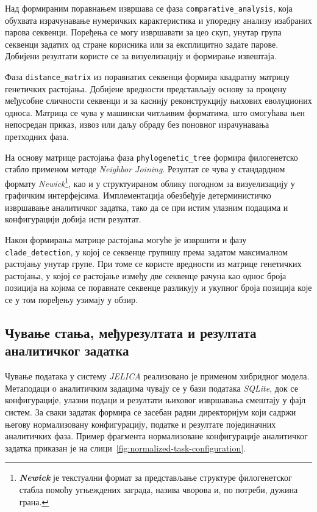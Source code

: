 \documentclass[12pt,oneside]{memoir}
\begin{document}
Над формираним поравнањем извршава се фаза \texttt{comparative\_analysis}, која обухвата израчунавање нумеричких карактеристика и упоредну анализу изабраних парова секвенци. Поређења се могу извршавати за цео скуп, унутар група секвенци задатих од стране корисника или за експлицитно задате парове. Добијени резултати користе се за визуелизацију и формирање извештаја.

Фаза \texttt{distance\_matrix} из поравнатих секвенци формира квадратну матрицу генетичких растојања. Добијене вредности представљају основу за процену међусобне сличности секвенци и за каснију реконструкцију њихових еволуционих односа. Матрица се чува у машински читљивим форматима, што омогућава њен непосредан приказ, извоз или даљу обраду без поновног израчунавања претходних фаза.

На основу матрице растојања фаза \texttt{phylogenetic\_tree} формира филогенетско стабло применом методе \textit{Neighbor Joining}. Резултат се чува у стандардном формату \textit{Newick}\footnote{\textit{\textbf{Newick}} је текстуални формат за представљање структуре филогенетског стабла помоћу угњеждених заграда, назива чворова и, по потреби, дужина грана.}, као и у структуираном облику погодном за визуелизацију у графичким интерфејсима. Имплементација обезбеђује детерминистичко извршавање аналитичког задатка, тако да се при истим улазним подацима и конфигурацији добија исти резултат.

Након формирања матрице растојања могуће је извршити и фазу \texttt{clade\_detection}, у којој се секвенце групишу према задатом максималном растојању унутар групе. При томе се користе вредности из матрице генетичких растојања, у којој се растојање између две секвенце рачуна као однос броја позиција на којима се поравнате секвенце разликују и укупног броја позиција које се у том поређењу узимају у обзир.


\subsection{Чување стања, међурезултата и резултата аналитичког задатка}
Чување података у систему \textit{JELICA} реализовано је применом хибридног модела. Метаподаци о аналитичким задацима чувају се у бази података \textit{SQLite}, док се конфигурације, улазни подаци и резултати њиховог извршавања смештају у фајл систем. За сваки задатак формира се засебан радни директоријум који садржи његову нормализовану конфигурацију, податке и резултате појединачних аналитичких фаза. Пример фрагмента нормализоване конфигурације аналитичког задатка приказан је на слици~\ref{fig:normalized-task-configuration}.
\end{document}
